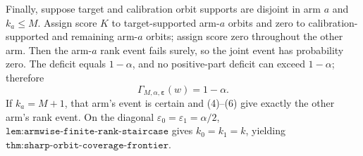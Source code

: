 Finally, suppose target and calibration orbit supports are disjoint in arm \(a\) and \(k_a\le M\). Assign score \(K\) to target-supported arm-\(a\) orbits and zero to calibration-supported and remaining arm-\(a\) orbits; assign score zero throughout the other arm. Then the arm-\(a\) rank event fails surely, so the joint event has probability zero. The deficit equals \(1-\alpha\), and no positive-part deficit can exceed \(1-\alpha\); therefore
\[
\Gamma_{M,\alpha,\boldsymbol\varepsilon}(w)=1-\alpha.
\tag{21}
\]
If \(k_a=M+1\), that arm's event is certain and (4)--(6) give exactly the other arm's rank event. On the diagonal \(\varepsilon_0=\varepsilon_1=\alpha/2\), \(\texttt{lem:armwise-finite-rank-staircase}\) gives \(k_0=k_1=k\), yielding \(\texttt{thm:sharp-orbit-coverage-frontier}\).